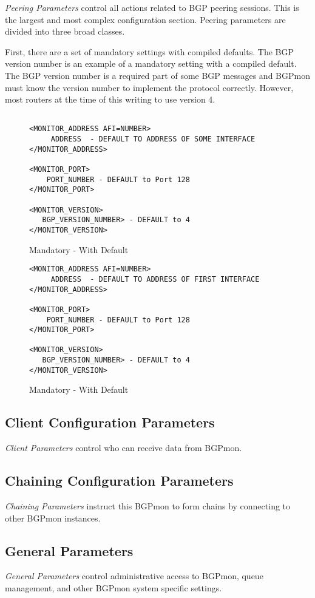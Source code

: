 \emph{Peering Parameters} control all actions related to BGP peering sessions.   This is the largest and most complex configuration section.      Peering parameters are divided into three broad classes.   

First,  there are a set of mandatory settings with compiled defaults.     The BGP version number is an example of a mandatory setting with a compiled default.    The BGP version number is a required part of some BGP messages and BGPmon must know the version number to implement the protocol correctly.     However,  most routers at the time of this writing to use version 4.   





\begin{figure}[!htb]
\begin{verbatim}

<MONITOR_ADDRESS AFI=NUMBER>   
     ADDRESS  - DEFAULT TO ADDRESS OF SOME INTERFACE 
</MONITOR_ADDRESS>

<MONITOR_PORT>
    PORT_NUMBER - DEFAULT to Port 128
</MONITOR_PORT>

<MONITOR_VERSION>
   BGP_VERSION_NUMBER> - DEFAULT to 4
</MONITOR_VERSION>

\end{verbatim}
\caption{Mandatory - With Default}
\label{fig:config:peer:settings}
\end{figure}

\begin{figure}[!htb]
\begin{verbatim}
<MONITOR_ADDRESS AFI=NUMBER>   
     ADDRESS  - DEFAULT TO ADDRESS OF FIRST INTERFACE 
</MONITOR_ADDRESS>

<MONITOR_PORT>
    PORT_NUMBER - DEFAULT to Port 128
</MONITOR_PORT>

<MONITOR_VERSION>
   BGP_VERSION_NUMBER> - DEFAULT to 4
</MONITOR_VERSION>
\end{verbatim}
\caption{Mandatory - With Default}
\label{fig:config:peer:settings}
\end{figure}

\subsection{Client Configuration Parameters}
\label{sec:config:clients}

\emph{Client Parameters} control who can receive data from BGPmon.

\subsection{Chaining Configuration Parameters}
\label{sec:config:chains}

\emph{Chaining Parameters} instruct this BGPmon to form chains by connecting to other BGPmon instances. 

\subsection{General Parameters}
\label{sec:config:general}

\emph{General Parameters} control administrative access to BGPmon,  queue management, and other BGPmon system specific settings.

